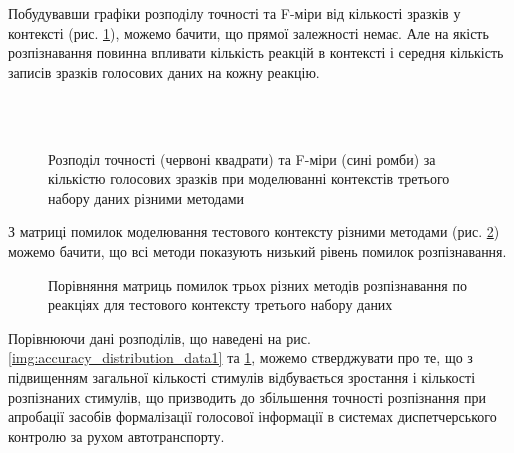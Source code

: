 Побудувавши графіки розподілу точності та F-міри від кількості зразків у контексті (рис. \ref{img:accuracy_distribution_data3}), можемо бачити, що прямої залежності немає. Але на якість розпізнавання повинна впливати кількість реакцій в контексті і середня кількість записів зразків голосових даних на кожну реакцію.

\begin{figure}[!t]
	\centering
	\\
	\\
	\caption{Розподіл точності (червоні квадрати) та F-міри (сині ромби) за кількістю голосових зразків при моделюванні контекстів третього набору даних різними методами}
	\label{img:accuracy_distribution_data3}
\end{figure}

З матриці помилок моделювання тестового контексту різними методами (рис. \ref{img:confusion_matrix_data3_context_21}) можемо бачити, що всі методи показують низький рівень помилок розпізнавання.

\begin{figure}
	\centering
	
	\caption{Порівняння матриць помилок трьох різних методів розпізнавання по реакціях для тестового контексту третього набору даних}
	\label{img:confusion_matrix_data3_context_21}
\end{figure}

Порівнюючи дані розподілів, що наведені на рис. \ref{img:accuracy_distribution_data1} та \ref{img:accuracy_distribution_data3}, можемо стверджувати про те, що з підвищенням загальної кількості стимулів відбувається зростання і кількості розпізнаних стимулів, що призводить до збільшення точності розпізнання при апробації засобів формалізації голосової інформації в системах диспетчерського контролю за рухом автотранспорту.

